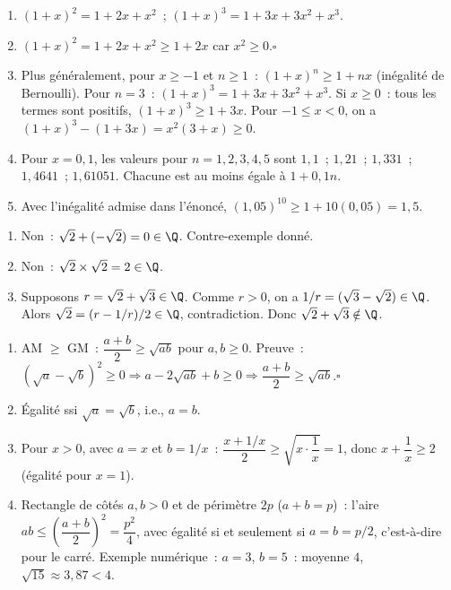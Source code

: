 \begin{enumerate}
  \item $(1+x)^2=1+2x+x^2$~; $(1+x)^3=1+3x+3x^2+x^3$.
  \item $(1+x)^2=1+2x+x^2\geq1+2x$ car $x^2\geq0$.\hfill$\square$
  \item Plus g\'en\'eralement, pour $x\geq-1$ et $n\geq1$~:
        $(1+x)^n\geq1+nx$ (in\'egalit\'e de Bernoulli).
        Pour $n=3$~: $(1+x)^3=1+3x+3x^2+x^3$.
        Si $x\geq0$~: tous les termes sont positifs, $(1+x)^3\geq1+3x$.\checkmark
        Pour $-1\leq x<0$, on a
        $(1+x)^3-(1+3x)=x^2(3+x)\geq0$.
  \item Pour $x=0{,}1$, les valeurs pour $n=1,2,3,4,5$ sont
        $1{,}1$~; $1{,}21$~; $1{,}331$~; $1{,}4641$~; $1{,}61051$.
        Chacune est au moins \'egale \`a $1+0{,}1n$.
  \item Avec l'in\'egalit\'e admise dans l'\'enonc\'e,
        $(1{,}05)^{10}\geq1+10(0{,}05)=1{,}5$.
\end{enumerate}


\begin{enumerate}
  \item Non~: $\sqrt{2}+(-\sqrt{2})=0\in\Q$. Contre-exemple donn\'e.
  \item Non~: $\sqrt{2}\times\sqrt{2}=2\in\Q$.
  \item Supposons $r=\sqrt2+\sqrt3\in\Q$.
        Comme $r>0$, on a $1/r=(\sqrt3-\sqrt2)\in\Q$.
        Alors $\sqrt2=(r-1/r)/2\in\Q$, contradiction.
        Donc $\sqrt2+\sqrt3\notin\Q$.
\end{enumerate}


\begin{enumerate}
  \item AM $\geq$ GM~: $\dfrac{a+b}{2}\geq\sqrt{ab}$ pour $a,b\geq0$.
        Preuve~: $(\sqrt{a}-\sqrt{b})^2\geq0
        \Rightarrow a-2\sqrt{ab}+b\geq0
        \Rightarrow\dfrac{a+b}{2}\geq\sqrt{ab}$.\hfill$\square$
  \item \'Egalit\'e ssi $\sqrt{a}=\sqrt{b}$, i.e., $a=b$.
  \item Pour $x>0$, avec $a=x$ et $b=1/x$~: $\dfrac{x+1/x}{2}\ge\sqrt{x\cdot\dfrac1x}=1$, donc $x+\dfrac1x\ge2$ (\'egalit\'e pour $x=1$).
  \item Rectangle de c\^ot\'es $a,b>0$ et de p\'erim\`etre $2p$ ($a+b=p$)~: l'aire $ab\le\left(\dfrac{a+b}{2}\right)^2=\dfrac{p^2}{4}$,
        avec \'egalit\'e si et seulement si $a=b=p/2$, c'est-\`a-dire pour le carr\'e. Exemple num\'erique~: $a=3$, $b=5$~: moyenne $4$, $\sqrt{15}\approx3{,}87<4$.
\end{enumerate}

